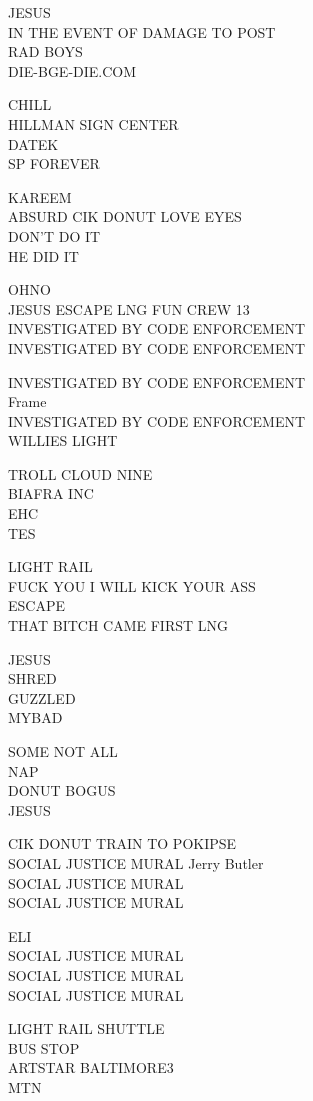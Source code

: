 \documentclass[10pt,letterpaper]{article}
\begin{document}
JESUS\\
IN THE EVENT OF DAMAGE TO POST\\
RAD BOYS\\
DIE{-}BGE{-}DIE.COM

CHILL\\
HILLMAN SIGN CENTER\\
DATEK\\
SP FOREVER

KAREEM\\
ABSURD CIK DONUT LOVE EYES\\
DON'T DO IT\\
HE DID IT

OHNO\\
JESUS ESCAPE LNG FUN CREW 13\\
INVESTIGATED BY CODE ENFORCEMENT\\
INVESTIGATED BY CODE ENFORCEMENT

INVESTIGATED BY CODE ENFORCEMENT\\
Frame\\
INVESTIGATED BY CODE ENFORCEMENT\\
WILLIES LIGHT

TROLL CLOUD NINE\\
BIAFRA INC\\
EHC\\
TES

LIGHT RAIL\\
FUCK YOU I WILL KICK YOUR ASS\\
ESCAPE\\
THAT BITCH CAME FIRST LNG

JESUS\\
SHRED\\
GUZZLED\\
MYBAD

SOME NOT ALL\\
NAP\\
DONUT BOGUS\\
JESUS

CIK DONUT TRAIN TO POKIPSE\\
SOCIAL JUSTICE MURAL Jerry Butler\\
SOCIAL JUSTICE MURAL\\
SOCIAL JUSTICE MURAL

ELI\\
SOCIAL JUSTICE MURAL\\
SOCIAL JUSTICE MURAL\\
SOCIAL JUSTICE MURAL

LIGHT RAIL SHUTTLE\\
BUS STOP\\
ARTSTAR BALTIMORE3\\
MTN
\end{document}
